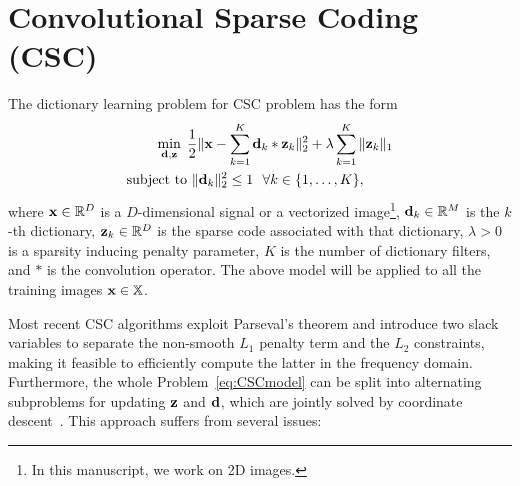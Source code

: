 \section{Convolutional Sparse Coding (CSC)}
The dictionary learning problem for CSC problem has the form
\begin{equation}\label{eq:CSCmodel}
\begin{split}
    \mini{\filter,\code} & \frac{1}{2}\|\signal - \sum_{k=1}^{K} \filter_k * \code_k \|_2^2 + \lambda \sum_{k=1}^{K}\| \code_k \|_1 \\
    \text{subject to} & ~ \|\filter_k\|^2_2 \leq 1 ~~ \forall k \in \{1,\dots,K\},
\end{split}
\end{equation}
where $\signal \in \mathbb{R}^D$ is a $D$-dimensional signal or a
vectorized image\footnote{In this manuscript, we work on 2D images.},
$\filter_k \in \mathbb{R}^M$ is the $k$-th dictionary, $\code_k\in
\mathbb{R}^D$ is the sparse code associated with that dictionary,
$\lambda>0$ is a sparsity inducing penalty parameter, $K$ is the
number of dictionary filters, and $*$ is the convolution operator. The
above model will be applied to all the training images
$\signal\in\mathbb{X}$.

Most recent CSC algorithms exploit Parseval's theorem and introduce
two slack variables to separate the non-smooth $L_1$ penalty term and
the $L_2$ constraints, making it feasible to efficiently compute the
latter in the frequency domain. Furthermore, the whole
Problem~\eqref{eq:CSCmodel} can be split into alternating subproblems
for updating $\code$ and $\filter$, which are jointly solved by
coordinate
descent~\cite{bristow2013fast,heide2015fast,wohlberg2016efficient}. This
approach suffers from several issues:

